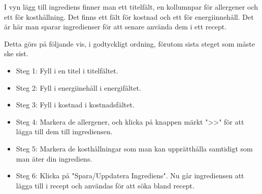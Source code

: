 I vyn lägg till ingrediens finner man ett titelfält, en kollumnpar för allergener och ett för kosthållning. Det finns ett fält för kostnad och ett för energiinnehåll. Det är här man sparar ingredienser för att senare använda dem i ett recept. 

Detta görs på följande vis, i godtyckligt ordning, förutom sista steget som måste ske sist. 

\begin{itemize}
\item Steg 1: Fyll i en titel i titelfältet.
\item Steg 2: Fyll i energiinehåll i energifältet.
\item Steg 3: Fyll i kostnad i kostnadsfältet. 
\item Steg 4: Markera de allergener, och klicka på knappen märkt ">>" för att lägga till dem till ingrediensen. 
\item Steg 5: Markera de kosthållningar som man kan upprätthålla samtidigt som man äter din ingrediens. 
\item Steg 6: Klicka på "Spara/Uppdatera Ingrediens". Nu går ingrediensen att lägga till i recept och användas för att söka bland recept.
\end{itemize}


